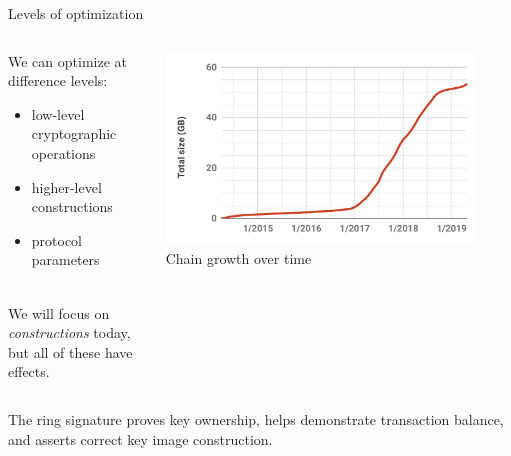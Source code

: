 \documentclass[aspectratio=169]{beamer}
\begin{document}
\begin{frame}{Levels of optimization}
\begin{columns}
\begin{column}{0.5\textwidth}
We can optimize at difference levels:
\begin{itemize}
\item low-level cryptographic operations
\item higher-level constructions
\item protocol parameters \\~\\
\end{itemize}

We will focus on \textit{constructions} today, but all of these have effects.
\end{column}
\begin{column}{0.5\textwidth}
\centering
\includegraphics[width=0.9\textwidth]{chain-growth.pdf} \\
Chain growth over time
\end{column}
\end{columns}
\end{frame}


\begin{frame}
\begin{figure}
\end{figure}
\centering
The ring signature proves key ownership, helps demonstrate transaction balance, and asserts correct key image construction.
\end{frame}
\end{document}
